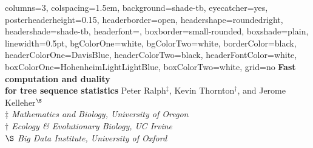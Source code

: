 \documentclass[fontscale=0.38,a0paper]{baposter}
\begin{document}
\newlength{\leftimgwidth}
\begin{poster}%
  {
  columns=3,
  colspacing=1.5em,
  background=shade-tb,
  eyecatcher=yes,
  posterheaderheight=0.15\textheight,
  headerborder=open,
  headershape=roundedright,
  headershade=shade-tb,
  headerfont=\Large\textsf, %
  boxborder=small-rounded,
  boxshade=plain,
  linewidth=0.5pt,
  bgColorOne=white,
  bgColorTwo=white,
  borderColor=black,
  headerColorOne=DavisBlue,
  headerColorTwo=black,
  headerFontColor=white,
  boxColorOne=HohenheimLightLightBlue,
  boxColorTwo=white,
  grid=no
  }
  {
  }
  {\sf %
  \vspace{0.5em}
     \textbf{\textcolor{DavisBlue}{Fast computation and duality \\ for tree sequence statistics}}\vspace{0.5em}}
  {\sf %
    Peter Ralph$^{\ddagger}$, Kevin Thornton$^{\dagger}$, and Jerome Kelleher$^{\S}$ \\  \vspace{-1.0mm}
    {\small \textit{$\ddagger$ Mathematics and Biology, University of Oregon} }\\ \vspace{-0.5em}
    {\small \textit{$\dagger$ Ecology \& Evolutionary Biology, UC Irvine} }\\ \vspace{-0.5em}
    {\small \textit{$\S$ Big Data Institute, University of Oxford} }\\ \vspace{0.5em}
}
\end{poster}
\end{document}
